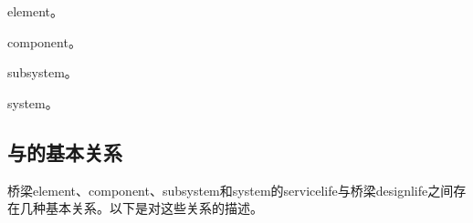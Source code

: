 \begin{description}[style=nextline,leftmargin=7.5em]
  \item [桥梁\gls{element}] \glsdesc*{element}。
  \item [桥梁\gls{component}] \glsdesc*{component}。
  \item [桥梁\gls{subsystem}] \glsdesc*{subsystem}。
  \item [桥梁\gls{system}] \glsdesc*{system}。
\end{description}

\subsection{与的基本关系}


桥梁\gls*{element}、\gls*{component}、\gls*{subsystem}和\gls*{system}的\gls*{servicelife}与桥梁\gls*{designlife}之间存在几种基本关系。以下是对这些关系的描述。

